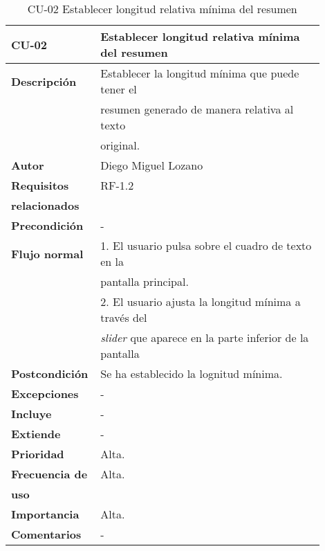 \begin{longtable}{>{\raggedright}b{0.2\linewidth}>{\raggedright\arraybackslash}b{0.7\linewidth}}
	\toprule
	\textbf{CU-02} & \textbf{Establecer longitud relativa mínima del resumen} \\
	\toprule
	\endhead
	
	\toprule
	\caption{CU-02 Establecer longitud relativa mínima del resumen}
	\endfoot
	
	\small{\textbf{Descripción}} & Establecer la longitud mínima que puede tener el \\
	& resumen generado de manera relativa al texto \\ & original. \\
	\small{\textbf{Autor}} & Diego Miguel Lozano \\
	\small{\textbf{Requisitos}} & RF-1.2  \\
	\small{\textbf{relacionados}} & \\
	\small{\textbf{Precondición}} & - \\
	\small{\textbf{Flujo normal}} & \quad \small{1. El usuario pulsa sobre el cuadro de texto en la} \\
	& \qquad \small{pantalla principal.} \\
	& \quad \small{2. El usuario ajusta la longitud mínima a través del} \\
	& \qquad \small{\emph{slider} que aparece en la parte inferior de la pantalla} \\
	\small{\textbf{Postcondición}} & Se ha establecido la lognitud mínima. \\
	\small{\textbf{Excepciones}} & - \\
	\small{\textbf{Incluye}} & - \\
	\small{\textbf{Extiende}} & - \\
	\small{\textbf{Prioridad}} & Alta. \\
	\small{\textbf{Frecuencia de}} & Alta. \\
	\small{\textbf{uso}} & \\
	\small{\textbf{Importancia}} & Alta. \\
	\small{\textbf{Comentarios}} &  - \\
\end{longtable}

